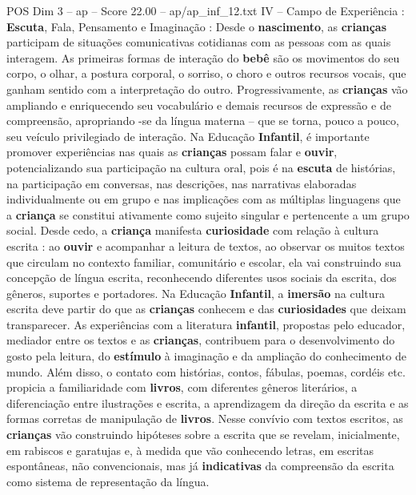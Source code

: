 \begin{textsample}{POS Dim 3 – ap – Score 22.00 – ap/ap\_inf\_12.txt}  \label{ex:f3_pos_182}
IV – Campo de Experiência : \textbf{Escuta}, Fala, Pensamento e Imaginação : Desde o \textbf{nascimento}, as \textbf{crianças} participam de situações comunicativas cotidianas com as pessoas com as quais interagem.
As primeiras formas de interação do \textbf{bebê} são os movimentos do seu corpo, o olhar, a postura corporal, o sorriso, o choro e outros recursos vocais, que ganham sentido com a interpretação do outro.
Progressivamente, as \textbf{crianças} vão ampliando e enriquecendo seu vocabulário e demais recursos de expressão e de compreensão, apropriando -se da língua materna – que se torna, pouco a pouco, seu veículo privilegiado de interação.
Na Educação \textbf{Infantil}, é importante promover experiências nas quais as \textbf{crianças} possam falar e \textbf{ouvir}, potencializando sua participação na cultura oral, pois é na \textbf{escuta} de histórias, na participação em conversas, nas descrições, nas narrativas elaboradas individualmente ou em grupo e nas implicações com as múltiplas linguagens que a \textbf{criança} se constitui ativamente como sujeito singular e pertencente a um grupo social.
Desde cedo, a \textbf{criança} manifesta \textbf{curiosidade} com relação à cultura escrita : ao \textbf{ouvir} e acompanhar a leitura de textos, ao observar os muitos textos que circulam no contexto familiar, comunitário e escolar, ela vai construindo sua concepção de língua escrita, reconhecendo diferentes usos sociais da escrita, dos gêneros, suportes e portadores.
Na Educação \textbf{Infantil}, a \textbf{imersão} na cultura escrita deve partir do que as \textbf{crianças} conhecem e das \textbf{curiosidades} que deixam transparecer.
As experiências com a literatura \textbf{infantil}, propostas pelo educador, mediador entre os textos e as \textbf{crianças}, contribuem para o desenvolvimento do gosto pela leitura, do \textbf{estímulo} à imaginação e da ampliação do conhecimento de mundo.
Além disso, o contato com histórias, contos, fábulas, poemas, cordéis etc. propicia a familiaridade com \textbf{livros}, com diferentes gêneros literários, a diferenciação entre ilustrações e escrita, a aprendizagem da direção da escrita e as formas corretas de manipulação de \textbf{livros}.
Nesse convívio com textos escritos, as \textbf{crianças} vão construindo hipóteses sobre a escrita que se revelam, inicialmente, em rabiscos e garatujas e, à medida que vão conhecendo letras, em escritas espontâneas, não convencionais, mas já \textbf{indicativas} da compreensão da escrita como sistema de representação da língua.

\end{textsample}
